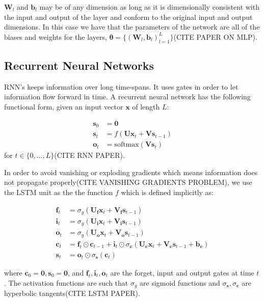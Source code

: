 $\bm{W}_l$ and $\bm{b}_l$ may be of any dimension as long as it is dimensionally consistent
with the input and output of the layer and conform to the original input and output
dimensions. In this case we have that the parameters of the network are all of
the biases and weights for the layers, $\bm{\theta} = \{(\bm{W}_l, \bm{b}_l)_{l
  = 1}^L\}$(CITE PAPER ON MLP).

\subsection{Recurrent Neural Networks}
RNN's keeps information over long time-spans. It uses gates in order to let
information flow forward in time. A recurrent neural network has the following
functional form, given an input vector $\bm{x}$ of length $L$:

\begin{align}
  \bm{s}_0 & = \bm{0} \\
  \bm{s}_t & = f(\bm{U} \bm{x}_t + \bm{V} \bm{s}_{t-1}) \\
  \bm{o}_t & = \text{softmax}(\bm{V} \bm{s}_t)
\end{align}
for $t \in \{0, \dots, L\}$(CITE RNN PAPER).

In order to avoid vanishing or exploding gradients which means information does
not propagate properly(CITE VANISHING GRADIENTS PROBLEM), we use the LSTM unit as the the function $f$ which is
defined implicitly as:

\begin{align}
  \bm{f}_t & = \sigma_g(\bm{U}_{\bm{f}} \bm{x}_t + \bm{V}_{\bm{f}} \bm{s}_{t-1}) \\
  \bm{i}_t & = \sigma_g(\bm{U}_{\bm{i}} \bm{x}_t + \bm{V}_{\bm{i}} \bm{s}_{t-1}) \\
  \bm{o}_t & = \sigma_g(\bm{U}_{\bm{o}} \bm{x}_t + \bm{V}_{\bm{o}} \bm{s}_{t-1}) \\
  \bm{c}_t & = \bm{f}_t \odot \bm{c}_{t-1} + \bm{i}_t \odot \sigma_{\bm{c}}(\bm{U}_{\bm{c}}\bm{x}_t + \bm{V}_{\bm{c}} \bm{s}_{t-1} + \bm{b}_{\bm{c}}) \\
  \bm{s}_t & = \bm{o}_t \odot \sigma_{\bm{s}}(\bm{c}_t)
\end{align}

where $\bm{c}_0 = \bm{0}, \bm{s}_0 = \bm{0}$, and $\bm{f}_t, \bm{i}_t, \bm{o}_t$
are the forget, input and output gates at time $t$. The activation functions are
such that $\sigma_g$ are sigmoid functions and $\sigma_{\bm{s}},
\sigma_{\bm{c}}$ are hyperbolic tangents(CITE LSTM PAPER).

